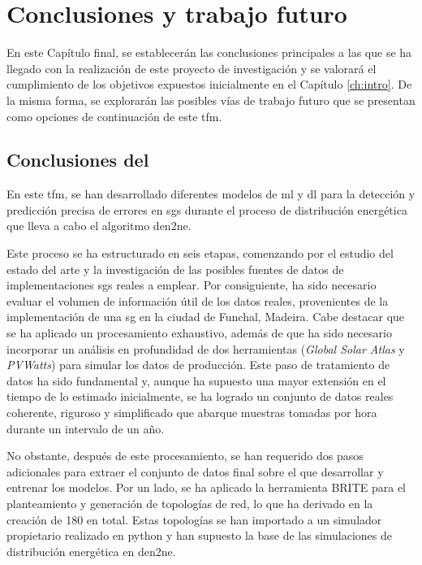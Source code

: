 \chapter{Conclusiones y trabajo futuro}
\label{conclusiones}

En este Capítulo final, se establecerán las conclusiones principales a las que se ha llegado con la realización de este proyecto de investigación y se valorará el cumplimiento de los objetivos expuestos inicialmente en el Capítulo \ref{ch:intro}. De la misma forma, se explorarán las posibles vías de trabajo futuro que se presentan como opciones de continuación de este \gls{tfm}.


\section{Conclusiones del }

En este \gls{tfm}, se han desarrollado diferentes modelos de \gls{ml} y \gls{dl} para la detección y predicción precisa de errores en \gls{sg}s durante el proceso de distribución energética que lleva a cabo el algoritmo \gls{den2ne}. 

\vspace{3mm}

Este proceso se ha estructurado en seis etapas, comenzando por el estudio del estado del arte y la investigación de las posibles fuentes de datos de implementaciones \gls{sg}s reales a emplear. Por consiguiente, ha sido necesario evaluar el volumen de información útil de los datos reales, provenientes de la implementación de una \gls{sg} en la ciudad de Funchal, Madeira. Cabe destacar que se ha aplicado un procesamiento exhaustivo, además de que ha sido necesario incorporar un análisis en profundidad de dos herramientas (\textit{Global Solar Atlas} y \textit{PVWatts}) para simular los datos de producción. Este paso de tratamiento de datos ha sido fundamental y, aunque ha supuesto una mayor extensión en el tiempo de lo estimado inicialmente, se ha logrado un conjunto de datos reales coherente, riguroso y simplificado que abarque muestras tomadas por hora durante un intervalo de un año.

\vspace{3mm}

No obstante, después de este procesamiento, se han requerido dos pasos adicionales para extraer el conjunto de datos final sobre el que desarrollar y entrenar los modelos. Por un lado, se ha aplicado la herramienta BRITE para el planteamiento y generación de topologías de red, lo que ha derivado en la creación de 180 en total. Estas topologías se han importado a un simulador propietario realizado en python y han supuesto la base de las simulaciones de distribución energética en \gls{den2ne}. 

